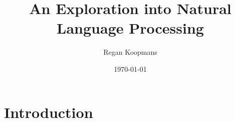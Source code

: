 \documentclass[11pt]{article}
\author{Regan Koopmans}
\date{\today}
\title{An Exploration into Natural Language Processing}
\begin{document}
\maketitle

\section{Introduction}
\label{sec:orgheadline1}
\end{document}
